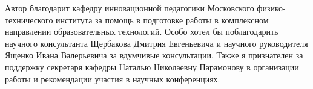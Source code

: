 Автор благодарит кафедру инновационной педагогики Московского физико-технического института за помощь 
в подготовке работы в комплексном направлении образовательных технологий. Особо хотел бы поблагодарить
научного консультанта Щербакова Дмитрия Евгеньевича и научного руководителя Ященко Ивана Валерьевича за вдумчивые консультации.
Также я признателен за поддержку секретаря кафедры Наталью Николаевну Парамонову в организации работы 
и рекомендации участия в научных конференциях. 
